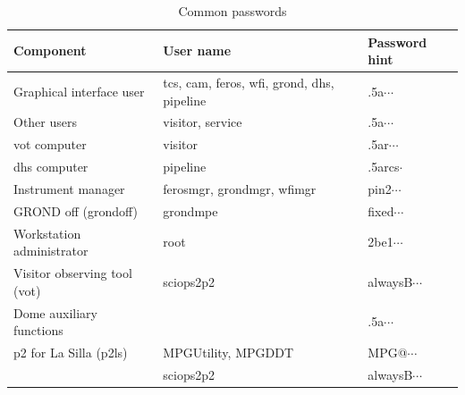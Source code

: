 \documentclass[11pt,fleqn,a4paper]{book}
\begin{document}
\begin{table}
\caption{Common passwords}
\label{tab:pwd}
\centering
\begin{tabular}{lll}
\hline
Component                    &  User name                                            & Password hint\\
\hline\hline
Graphical interface user     & tcs, cam, feros, wfi, grond, dhs, pipeline & .5a$\cdots$\\
Other users                  & \gls{visitor}, \gls{service}               & .5a$\cdots$\\
vot computer                 & \gls{visitor}                              & .5ar$\cdots$\\
dhs computer                 & pipeline                                   & .5arcs$\cdot$\\
Instrument manager           & ferosmgr, grondmgr, wfimgr                 & pin2$\cdots$\\
GROND off (grondoff)         & grondmpe                                   & fixed$\cdots$\\
Workstation administrator    & root                                       & 2be1$\cdots$\\
Visitor observing tool (vot) & sciops2p2                                  & alwaysB$\cdots$\\
Dome auxiliary functions     &                                            & .5a$\cdots$\\
p2 for La Silla (p2ls)       & MPGUtility, MPGDDT                         & MPG@$\cdots$\\
                             & sciops2p2                                  & alwaysB$\cdots$\\
\hline
\end{tabular}
\end{table}
\end{document}
